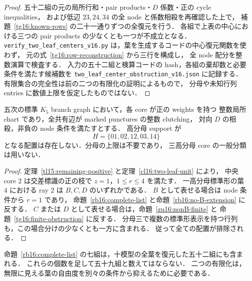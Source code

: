 \begin{proof}
五十二組の元の局所行和・pair products・$D$ 係数・正の cycle inequalities，
および低辺 $23,24,34$ の全 node と係数相殺を再確認した上で，
補題~\ref{tg16:known-rows} の二十一通りずつの全復元を行う．
各組で上表の中心における三つの pair products の少なくとも一つが不成立となる．
\nolinkurl{verify_two_leaf_centers_v16.py} は，葉を生成するコードの中心復元関数を使わず，
元の式~\eqref{tg16:row-reconstruction} から三行を構成し，
全 node 配分を整数演算で検査する．
入力の五十二組と検算コードの hash，各組の棄却数と必要条件を満たす候補数を
\nolinkurl{two_leaf_center_obstruction_v16.json} に記録する．
有限集合の完全性は前の二つの有限化の証明によるもので，
分母や未知行列 entries に数値上限を仮定したものではない．
\end{proof}

\begin{theorem}
\label{tg16:no-two-leaf-triangle}
五次の標準 $K_5$ branch graph において，各 core が正の weights を持つ
整数局所 chart であり，全共有辺が marked punctures の整数 clutching，
対向 $D$ の相殺，非負の node 条件を満たすとする．
高分母 support が
\[
 H=\{01,02,12,03,14\}
\]
となる配置は存在しない．分母の上限は不要であり，
三高分母 core の一般分類は用いない．
\end{theorem}

\begin{proof}
定理~\ref{tl15:remaining-positive} と定理~\ref{cl16:two-leaf-unit} により，
中央 core $2$ は交差標識の正の枝で $z=1$，$1\le r\le4$ を満たす．
一高分母標準形の葉 $4$ における ray $2$ は $B,C,D$ のいずれかである．
$B$ として表せる場合は node 条件から $r=1$ であり，
命題~\ref{rb16:complete-list} と命題~\ref{rb16:no-B-extension} に反する．
$C$ または $D$ として表せる場合は，命題~\ref{zu16:nonB-finite} と
命題~\ref{tg16:finite-obstruction} に反する．
分母三で複数の標準形表示を持つ行列も，この場合分けの少なくとも一方に含まれる．
従って全ての配置が排除される．
\end{proof}

命題~\ref{rb16:complete-list} の七組は，十模型の全葉を復元した五十二組にも含まれる．
これらの個数を足して五十九組と数えてはならない．
二つの有限化は，無限に見える葉の自由度を別々の条件から抑えるために必要である．

